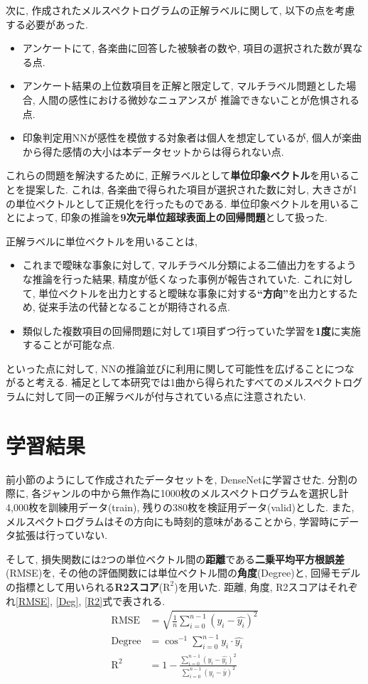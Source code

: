 \documentclass[a4paper,11pt,dvipdfmx]{jreport}
\begin{document}
次に, 作成されたメルスペクトログラムの正解ラベルに関して, 以下の点を考慮する必要があった.
\begin{itemize}
  \item アンケートにて, 各楽曲に回答した被験者の数や, 項目の選択された数が異なる点.
  \item アンケート結果の上位数項目を正解と限定して, マルチラベル問題とした場合, 人間の感性における微妙なニュアンスが
        推論できないことが危惧される点.
  \item 印象判定用NNが感性を模倣する対象者は個人を想定しているが, 個人が楽曲から得た感情の大小は本データセットからは得られない点. 
\end{itemize}
これらの問題を解決するために, 正解ラベルとして\textbf{単位印象ベクトル}を用いることを提案した.
これは, 各楽曲で得られた項目が選択された数に対し, 大きさが1の単位ベクトルとして正規化を行ったものである.
単位印象ベクトルを用いることによって, 印象の推論を\textbf{9次元単位超球表面上の回帰問題}として扱った. 

正解ラベルに単位ベクトルを用いることは, 
\begin{itemize}
  \item これまで曖昧な事象に対して, マルチラベル分類による二値出力をするような推論を行った結果, 精度が低くなった事例が報告されていた.
        これに対して, 単位ベクトルを出力とすると曖昧な事象に対する\textbf{``方向''}を出力とするため, 従来手法の代替となることが期待される点.
  \item 類似した複数項目の回帰問題に対して1項目ずつ行っていた学習を\textbf{1度}に実施することが可能な点.
\end{itemize}
といった点に対して, NNの推論並びに利用に関して可能性を広げることにつながると考える.
補足として本研究では1曲から得られたすべてのメルスペクトログラムに対して同一の正解ラベルが付与されている点に注意されたい.

\section{学習結果}
\label{learning}
前小節のようにして作成されたデータセットを, DenseNetに学習させた.
分割の際に, 各ジャンルの中から無作為に1000枚のメルスペクトログラムを選択し計4,000枚を訓練用データ(train), 残りの380枚を検証用データ(valid)とした.
また, メルスペクトログラムはその方向にも時刻的意味があることから, 学習時にデータ拡張は行っていない.

\newpage
そして, 損失関数には2つの単位ベクトル間の\textbf{距離}である\textbf{二乗平均平方根誤差}(RMSE)を, その他の評価関数には単位ベクトル間の\textbf{角度}(Degree)と, 回帰モデルの指標として用いられる\textbf{R2スコア}($\mathrm{R^2}$)を用いた.
距離, 角度, R2スコアはそれぞれ\ref{RMSE}, \ref{Deg}, \ref{R2}式で表される.
\begin{align}
  \mathrm{RMSE}&= \sqrt{\frac{1}{n} \sum_{i=0}^{n-1} (y_i - \hat{y_i})^2}\label{RMSE} \\ 
  \mathrm{Degree} &= \cos^{-1}{\sum_{i=0}^{n-1}y_i \cdot \hat{y_i}}\label{Deg}\\
  \mathrm{R^2} &= 1 - \frac{\displaystyle \sum_{i=0}^{n-1}(y_i - \hat{y_i})^2}{\displaystyle \sum_{i=0}^{n-1}(y_i - \bar{y})^2}\label{R2}
\end{align}
\end{document}
